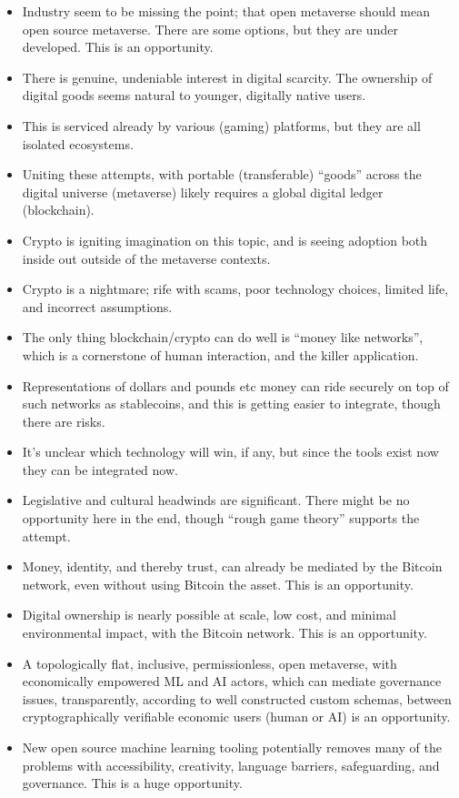{\begin{itemize}
\item Industry seem to be missing the point; that open metaverse should mean open source metaverse. There are some options, but they are under developed. This is an opportunity.
\item There is genuine, undeniable interest in digital scarcity. The ownership of digital goods seems natural to younger, digitally native users.
\item This is serviced already by various (gaming) platforms, but they are all isolated ecosystems.
\item Uniting these attempts, with portable (transferable) ``goods'' across the digital universe (metaverse) likely requires a global digital ledger (blockchain).
\item Crypto is igniting imagination on this topic, and is seeing adoption both inside out outside of the metaverse contexts.
\item Crypto is a nightmare; rife with scams, poor technology choices, limited life, and incorrect assumptions.
\item The only thing blockchain/crypto can do well is ``money like networks'', which is a cornerstone of human interaction, and the killer application.
\item Representations of dollars and pounds etc money can ride securely on top of such networks as stablecoins, and this is getting easier to integrate, though there are risks.
\item It's unclear which technology will win, if any, but since the tools exist now they can be integrated now.
\item Legislative and cultural headwinds are significant. There might be no opportunity here in the end, though ``rough game theory'' supports the attempt.
\item Money, identity, and thereby trust, can already be mediated by the Bitcoin network, even without using Bitcoin the asset. This is an opportunity.
\item Digital ownership is nearly possible at scale, low cost, and minimal environmental impact, with the Bitcoin network. This is an opportunity.
\item A topologically flat, inclusive, permissionless, open metaverse, with economically empowered ML and AI actors, which can mediate governance issues, transparently, according to well constructed custom schemas, between cryptographically verifiable economic users (human or AI) is an opportunity.
\item New open source machine learning tooling potentially removes many of the problems with accessibility, creativity, language barriers, safeguarding, and governance. This is a huge opportunity.
\end{itemize}
}

